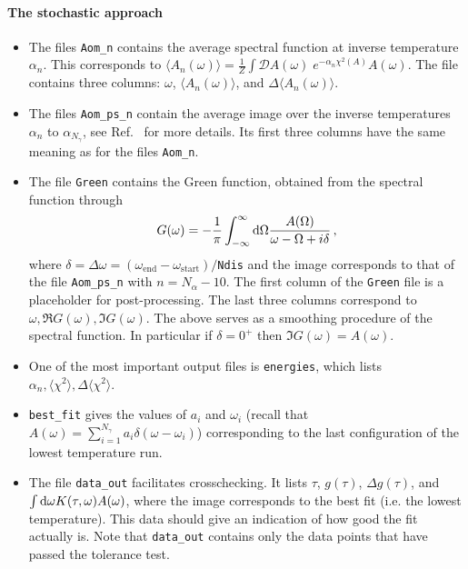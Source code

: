 \paragraph*{The stochastic  approach}
\begin{itemize}
\item The files  \texttt{Aom\_n} contains the average spectral function at inverse temperature  $ \alpha_n $. This corresponds to
$  \langle A_n(\omega) \rangle =   \frac{1}{Z}   \int \mathcal{D}\!A(\omega) \; e^{-\alpha_n \chi^{2}(A)  } A(\omega). $
The file contains three columns: $\omega$, $\langle A_n(\omega) \rangle$, and $\Delta \langle A_n(\omega) \rangle$.

\item The files \texttt{Aom\_ps\_n}  contain the average image over the inverse  temperatures  $ \alpha_n $ to $ \alpha_{N_\gamma}$, see Ref.~\cite{Beach04a} for more details.   
 Its first three columns have the same meaning as for the files \texttt{Aom\_n}.

\item The file \texttt{Green} contains the Green function, obtained from the spectral function through
\begin{equation}
 G(\omega) =  -\frac{1}{\pi} \int_{-\infty}^{\infty} \mathrm{d} \Omega   \frac{A(\Omega)}{\omega - \Omega + i \delta} \,,
\end{equation}
where  $ \delta =  \Delta \omega = (\omega_\mathrm{end} -  \omega_\mathrm{start})/$\texttt{Ndis} and the image corresponds to that of the file \texttt{Aom\_ps\_n} with $ n = N_{\alpha} -10 $. 
The first column of the  \texttt{Green}  file is a placeholder for post-processing. The last three columns   correspond to $\omega, \Re G(\omega) ,   \Im G(\omega) $. The above serves as a smoothing procedure of the spectral function. In particular  if $\delta = 0^+$  then  $\Im G(\omega) = A(\omega) $.


\item  One of the most important output files is \texttt{energies}, which lists $ \alpha_n, \langle \chi^2 \rangle, \Delta \langle \chi^2 \rangle $.

\item  \texttt{best\_fit}  gives the values of $a_i$ and $\omega_i$   (recall that $ A(\omega)  = \sum_{i=1}^{N_{\gamma}} a_{i} \delta \left( \omega - \omega_i \right)$) corresponding to the last configuration of the  lowest temperature run.

\item The file \texttt{data\_out} facilitates crosschecking. 
It lists $\tau$,  $g(\tau)$, $\Delta g(\tau)$, and $\int \mathrm{d} \omega  K(\tau, \omega) A(\omega)$, where the image 
corresponds to the best fit (i.e. the lowest temperature). This data should give an indication of how good the fit actually is.
Note that  \texttt{data\_out} contains only the data points that have  passed the tolerance test. 


\end{itemize}
